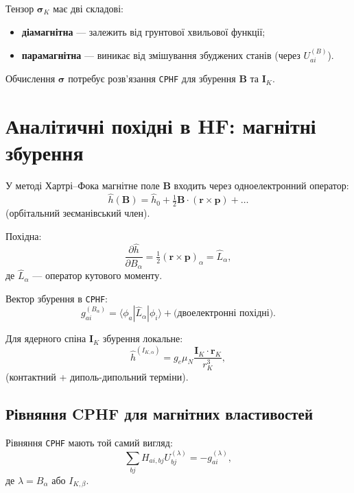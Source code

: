 Тензор \(\boldsymbol\sigma_K\) має дві складові:
\begin{itemize}
	\item \textbf{діамагнітна} — залежить від грунтової хвильової функції;
	\item \textbf{парамагнітна} — виникає від змішування збуджених станів (через \(U_{ai}^{(B)}\)).
\end{itemize}

Обчислення \(\boldsymbol\sigma\) потребує розв’язання \texttt{CPHF} для збурення \(\mathbf B\) та \(\mathbf I_K\).

\section{Аналітичні похідні в HF: магнітні збурення}

У методі Хартрі–Фока магнітне поле \(\mathbf B\) входить через одноелектронний оператор:
\begin{equation}
	\hat h(\mathbf B) = \hat h_0 + \tfrac12 \mathbf B \cdot (\mathbf r \times \mathbf p) + \dots
\end{equation}
(орбітальний зеєманівський член).

Похідна:
\begin{equation}
	\frac{\partial \hat h}{\partial B_\alpha} = \tfrac12 (\mathbf r \times \mathbf p)_\alpha = \hat L_\alpha,
\end{equation}
де \(\hat L_\alpha\) — оператор кутового моменту.

Вектор збурення в \texttt{CPHF}:
\begin{equation}
	g_{ai}^{(B_\alpha)} = \langle \phi_a | \hat L_\alpha | \phi_i \rangle + \text{(двоелектронні похідні)}.
\end{equation}

Для ядерного спіна \(\mathbf I_K\) збурення локальне:
\begin{equation}
	\hat h^{(I_{K,\alpha})} = g_e \mu_N \frac{\mathbf I_K \cdot \mathbf r_K}{r_K^3},
\end{equation}
(контактний + диполь-дипольний терміни).

\subsection{Рівняння CPHF для магнітних властивостей}

Рівняння \texttt{CPHF} мають той самий вигляд:
\begin{equation}
	\sum_{bj} H_{ai,bj} U_{bj}^{(\lambda)} = -g_{ai}^{(\lambda)},
\end{equation}
де \(\lambda = B_\alpha\) або \(I_{K,\beta}\).

